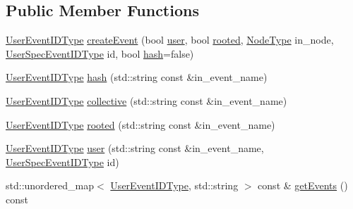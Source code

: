 \subsection*{Public Member Functions}
\begin{DoxyCompactItemize}
\item 
\hyperlink{namespacevt_1_1trace_a5908920d051c144c89f17c69ed262350}{User\+Event\+I\+D\+Type} \hyperlink{structvt_1_1trace_1_1_user_event_registry_ac219431476480a6c9fe10ede067b33d2}{create\+Event} (bool \hyperlink{structvt_1_1trace_1_1_user_event_registry_a6a2156b87f22007a4a20ca1b7e96d2fe}{user}, bool \hyperlink{structvt_1_1trace_1_1_user_event_registry_a8b940e39914a9d3ba1acf0a219f6d44d}{rooted}, \hyperlink{namespacevt_a866da9d0efc19c0a1ce79e9e492f47e2}{Node\+Type} in\+\_\+node, \hyperlink{namespacevt_1_1trace_a70c43e0e1596eea236912d4197d3120a}{User\+Spec\+Event\+I\+D\+Type} id, bool \hyperlink{structvt_1_1trace_1_1_user_event_registry_a99ef8a7f7df7a11fac6ada816f83cfbf}{hash}=false)
\item 
\hyperlink{namespacevt_1_1trace_a5908920d051c144c89f17c69ed262350}{User\+Event\+I\+D\+Type} \hyperlink{structvt_1_1trace_1_1_user_event_registry_a99ef8a7f7df7a11fac6ada816f83cfbf}{hash} (std\+::string const \&in\+\_\+event\+\_\+name)
\item 
\hyperlink{namespacevt_1_1trace_a5908920d051c144c89f17c69ed262350}{User\+Event\+I\+D\+Type} \hyperlink{structvt_1_1trace_1_1_user_event_registry_a351d80d6d91bcd47e9fff0f6ed18df4d}{collective} (std\+::string const \&in\+\_\+event\+\_\+name)
\item 
\hyperlink{namespacevt_1_1trace_a5908920d051c144c89f17c69ed262350}{User\+Event\+I\+D\+Type} \hyperlink{structvt_1_1trace_1_1_user_event_registry_a8b940e39914a9d3ba1acf0a219f6d44d}{rooted} (std\+::string const \&in\+\_\+event\+\_\+name)
\item 
\hyperlink{namespacevt_1_1trace_a5908920d051c144c89f17c69ed262350}{User\+Event\+I\+D\+Type} \hyperlink{structvt_1_1trace_1_1_user_event_registry_a6a2156b87f22007a4a20ca1b7e96d2fe}{user} (std\+::string const \&in\+\_\+event\+\_\+name, \hyperlink{namespacevt_1_1trace_a70c43e0e1596eea236912d4197d3120a}{User\+Spec\+Event\+I\+D\+Type} id)
\item 
std\+::unordered\+\_\+map$<$ \hyperlink{namespacevt_1_1trace_a5908920d051c144c89f17c69ed262350}{User\+Event\+I\+D\+Type}, std\+::string $>$ const  \& \hyperlink{structvt_1_1trace_1_1_user_event_registry_aaa8cbfc8f3596bb5f9aa97cccd72f890}{get\+Events} () const
\end{DoxyCompactItemize}
